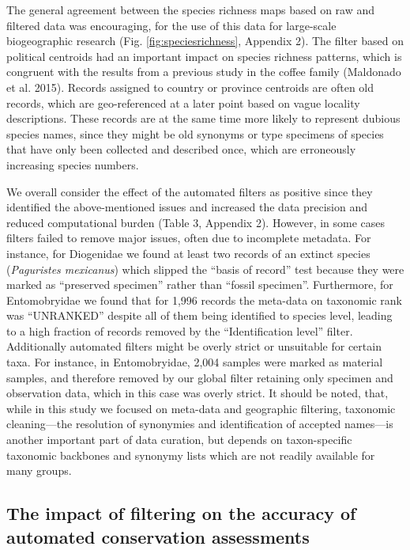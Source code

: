\documentclass[fleqn,10pt,lineno]{wlpeerj} %
\begin{document}
The general agreement between the species richness maps based on raw and filtered data was encouraging, for the use of this data for large-scale biogeographic research (Fig. \ref{fig:speciesrichness}, Appendix 2). The filter based on political centroids had an important impact on species richness patterns, which is congruent with the results from a previous study in the coffee family (Maldonado et al. 2015). Records assigned to country or province centroids are often old records, which are geo-referenced at a later point based on vague locality descriptions. These records are at the same time more likely to represent dubious species names, since they might be old synonyms or type specimens of species that have only been collected and described once, which are erroneously increasing species numbers.

We overall consider the effect of the automated filters as positive since they identified the above-mentioned issues and increased the data precision and reduced computational burden (Table 3, Appendix 2). However, in some cases filters failed to remove major issues, often due to incomplete metadata. For instance, for Diogenidae we found at least two records of an extinct species (\emph{Paguristes mexicanus}) which slipped the ``basis of record'' test because they were marked as ``preserved specimen'' rather than ``fossil specimen''. Furthermore, for Entomobryidae we found that for 1,996 records the meta-data on taxonomic rank was ``UNRANKED'' despite all of them being identified to species level, leading to a high fraction of records removed by the ``Identification level'' filter. Additionally automated filters might be overly strict or unsuitable for certain taxa. For instance, in Entomobryidae, 2,004 samples were marked as material samples, and therefore removed by our global filter retaining only specimen and observation data, which in this case was overly strict. It should be noted, that, while in this study we focused on meta-data and geographic filtering, taxonomic cleaning---the resolution of synonymies and identification of accepted names---is another important part of data curation, but depends on taxon-specific taxonomic backbones and synonymy lists which are not readily available for many groups.

\hypertarget{the-impact-of-filtering-on-the-accuracy-of-automated-conservation-assessments}{%
\subsection*{The impact of filtering on the accuracy of automated conservation assessments}\label{the-impact-of-filtering-on-the-accuracy-of-automated-conservation-assessments}}
\end{document}
